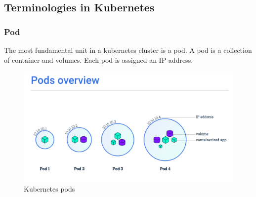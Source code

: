 \documentclass[12pt]{article}
\begin{document}
\subsection{Terminologies in Kubernetes}
\subsubsection{Pod}
The most fundamental unit in a kubernetes cluster is a pod. A pod is a collection of container and volumes. Each pod is assigned an IP address.\\
\begin{figure}[h!]
	\begin{center}
		\includegraphics[width=\textwidth, trim= 0 0 0 7cm, clip=true]{pods}
		\caption{Kubernetes pods}
	\end{center}
\end{figure}
\end{document}
